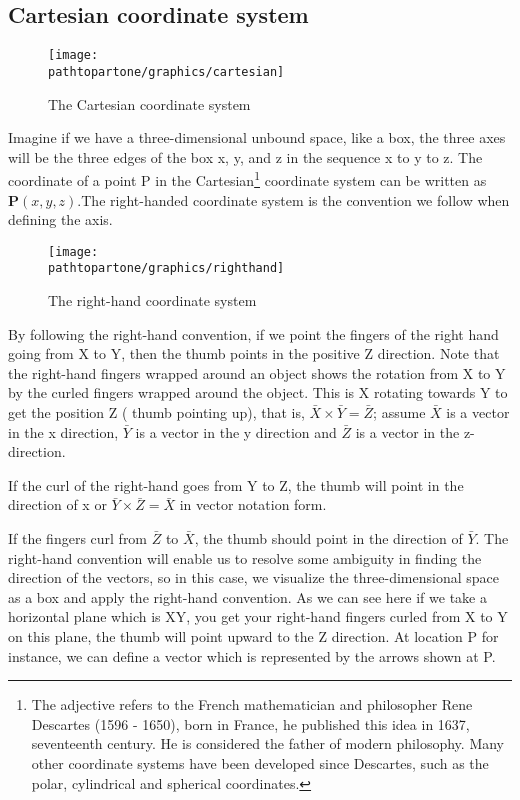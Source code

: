 \subsection{Cartesian coordinate system}
\begin{figure}[h]
\centering
\texttt{[image: \\pathtopartone/graphics/cartesian]}
\caption{The Cartesian  coordinate system}
\end{figure}

Imagine if we have a three-dimensional unbound space, like a box, the three axes will be the three edges of the box x, y, and z in the sequence x to y to z. The coordinate of a point P in the {Cartesian}\footnote{The adjective \textacutedbl refers to the French mathematician and philosopher Rene Descartes (1596 - 1650), born in France, he published this idea in 1637, seventeenth century. He is considered the father of modern philosophy. Many other coordinate systems have been developed since Descartes, such as the polar, cylindrical and spherical coordinates.} coordinate system can be written as $\boldsymbol{P}(x, y, z)$.The right-handed coordinate system is the convention we follow when defining the axis.
\begin{figure}[h]
\centering
\texttt{[image: \\pathtopartone/graphics/righthand]}
\caption{The right-hand coordinate system}
\end{figure}

By following the right-hand convention, if we point the fingers of the right hand going from X to Y, then the thumb points in the positive Z direction. Note that the right-hand fingers wrapped around an object shows the rotation from X to Y by the curled fingers wrapped around the object. This is X rotating towards Y to get the position Z ( thumb pointing up), that is, $\bar{X} \times \bar{Y} = \bar{Z}$; assume  $\bar{X}$ is a vector in the x direction, $\bar{Y}$ is a vector in the y direction and $\bar{Z}$ is a vector in the z-direction.

If the curl of the right-hand goes from Y to Z, the thumb will point in the direction of x or $\bar{Y} \times \bar{Z} = \bar{X}$ in vector notation form.

If the fingers curl from $\bar{Z}$ to $\bar{X}$, the thumb should point in the direction of $\bar{Y}$. The right-hand convention will enable us to resolve some ambiguity in finding the direction of the vectors, so in this case, we visualize the three-dimensional space as a box and apply the right-hand convention. As we can see here if we take a horizontal plane which is XY, you get your right-hand fingers curled from X to Y on this plane, the thumb will point upward to the Z direction. At location P for instance, we can define a vector which is represented by the arrows shown at P.

